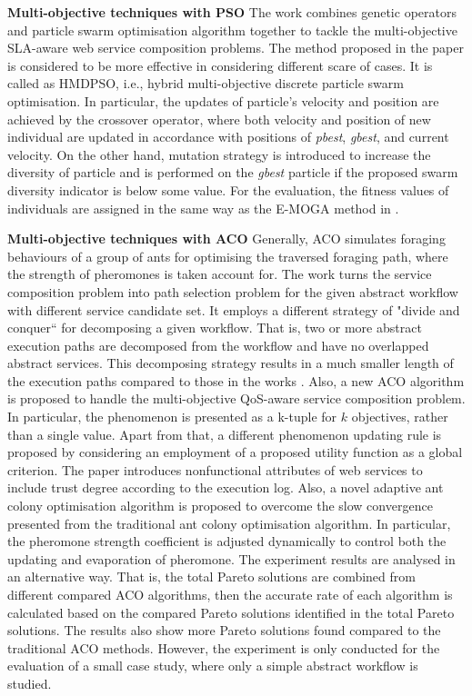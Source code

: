 \textbf{Multi-objective techniques with PSO} The work \cite{yin2014hybrid} combines genetic operators and particle swarm optimisation algorithm together to tackle the multi-objective SLA-aware web service composition problems. The method proposed in the paper  is considered to be more effective in  considering different scare of cases.  It is called as HMDPSO, i.e., hybrid multi-objective discrete particle swarm optimisation. In particular, the updates of particle's velocity and position are achieved by the crossover operator, where both velocity and position of new individual are updated in accordance with positions of \textit{pbest}, \textit{gbest}, and current velocity. On the other hand, mutation strategy is introduced to increase the diversity of particle and is performed on the \textit{gbest} particle if the proposed swarm diversity indicator is below some value. For the evaluation,  the fitness values of individuals are assigned in the same way as the E-MOGA method in \cite{wada2012e3}.

\textbf{Multi-objective techniques with ACO} Generally, ACO simulates foraging behaviours of a group of ants for optimising the traversed foraging path, where the strength of pheromones is taken account for. The work \cite{zhang2010qos} turns the service composition problem into path selection problem for the given abstract workflow with different service candidate set. It employs a different strategy of "divide and conquer`` for decomposing a given workflow. That is,  two or more abstract execution paths are decomposed from the workflow and have no overlapped abstract services. This decomposing strategy results in a much smaller length of the execution paths compared to those in the works \cite{yu2007efficient}.  Also, a new ACO algorithm is proposed to handle the multi-objective QoS-aware service composition problem. In particular,  the phenomenon is presented as a k-tuple for $k$ objectives, rather than a single value. Apart from that, a different phenomenon updating rule is proposed by considering an employment of a proposed utility function as a global criterion. The paper \cite{wang2014novel} introduces nonfunctional attributes of web services to include trust degree according to the execution log. Also, a novel adaptive ant colony optimisation algorithm is proposed to overcome the slow convergence presented from the traditional ant colony optimisation algorithm. In particular, the pheromone strength coefficient is adjusted dynamically to control both the updating and evaporation of pheromone. The experiment results are analysed in an alternative way. That is, the total Pareto solutions are combined from different compared ACO algorithms, then the accurate rate of each algorithm is calculated based on the compared Pareto solutions identified in the total Pareto solutions. The results also show more Pareto solutions found compared to the traditional ACO methods. However, the experiment is only conducted for the evaluation of a small case study, where only a simple abstract workflow is studied.

